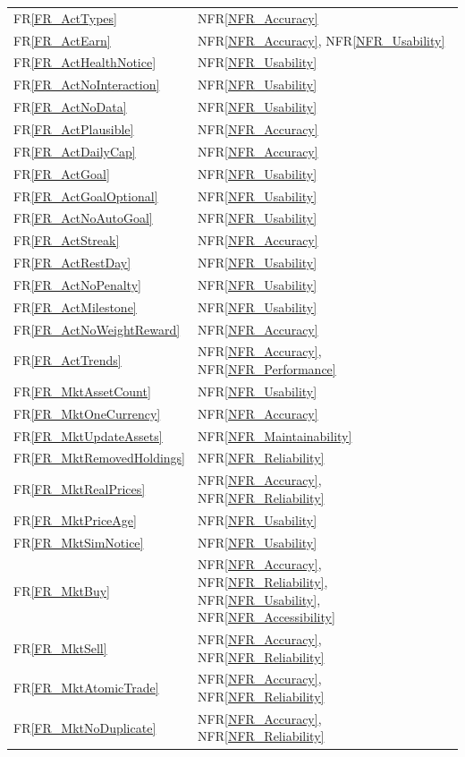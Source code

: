 \documentclass[12pt]{article}
\newcommand{\rref}[1]{FR\ref{#1}}
\newcommand{\nfrref}[1]{NFR\ref{#1}}
\begin{document}
\begin{longtable}{p{} p{}}
\rref{FR_ActTypes} & \nfrref{NFR_Accuracy} \\
\rref{FR_ActEarn} & \nfrref{NFR_Accuracy}, \nfrref{NFR_Usability} \\
\rref{FR_ActHealthNotice} & \nfrref{NFR_Usability} \\
\rref{FR_ActNoInteraction} & \nfrref{NFR_Usability} \\
\rref{FR_ActNoData} & \nfrref{NFR_Usability} \\
\rref{FR_ActPlausible} & \nfrref{NFR_Accuracy} \\
\rref{FR_ActDailyCap} & \nfrref{NFR_Accuracy} \\
\rref{FR_ActGoal} & \nfrref{NFR_Usability} \\
\rref{FR_ActGoalOptional} & \nfrref{NFR_Usability} \\
\rref{FR_ActNoAutoGoal} & \nfrref{NFR_Usability} \\
\rref{FR_ActStreak} & \nfrref{NFR_Accuracy} \\
\rref{FR_ActRestDay} & \nfrref{NFR_Usability} \\
\rref{FR_ActNoPenalty} & \nfrref{NFR_Usability} \\
\rref{FR_ActMilestone} & \nfrref{NFR_Usability} \\
\rref{FR_ActNoWeightReward} & \nfrref{NFR_Accuracy} \\
\rref{FR_ActTrends} & \nfrref{NFR_Accuracy}, \nfrref{NFR_Performance} \\
\rref{FR_MktAssetCount} & \nfrref{NFR_Usability} \\
\rref{FR_MktOneCurrency} & \nfrref{NFR_Accuracy} \\
\rref{FR_MktUpdateAssets} & \nfrref{NFR_Maintainability} \\
\rref{FR_MktRemovedHoldings} & \nfrref{NFR_Reliability} \\
\rref{FR_MktRealPrices} & \nfrref{NFR_Accuracy}, \nfrref{NFR_Reliability} \\
\rref{FR_MktPriceAge} & \nfrref{NFR_Usability} \\
\rref{FR_MktSimNotice} & \nfrref{NFR_Usability} \\
\rref{FR_MktBuy} & \nfrref{NFR_Accuracy}, \nfrref{NFR_Reliability}, \nfrref{NFR_Usability}, \nfrref{NFR_Accessibility} \\
\rref{FR_MktSell} & \nfrref{NFR_Accuracy}, \nfrref{NFR_Reliability} \\
\rref{FR_MktAtomicTrade} & \nfrref{NFR_Accuracy}, \nfrref{NFR_Reliability} \\
\rref{FR_MktNoDuplicate} & \nfrref{NFR_Accuracy}, \nfrref{NFR_Reliability} \\

\end{longtable}
\end{document}
